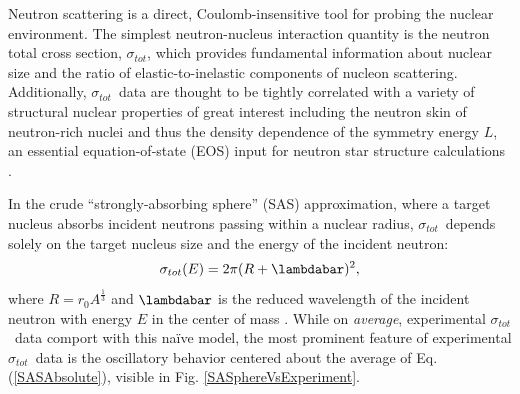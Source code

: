 \documentclass[twocolumn,secnumarabic,amssymb, nobibnotes, aps, prl,
superscriptaddress, nobalancelastpage]{revtex4}
\newcommand{\tot}{\ensuremath{\sigma_{tot}}}
\newcommand{\totRD}{\ensuremath{\sigma_{A,A'}}(E)}
\begin{document}
Neutron scattering is a direct, Coulomb-insensitive tool for probing the nuclear
environment. The simplest neutron-nucleus interaction quantity is 
the neutron total cross section, \tot, which provides fundamental information about
nuclear size and the ratio of elastic-to-inelastic components of nucleon 
scattering. Additionally, \tot\ data are thought to be tightly correlated with
a variety of structural nuclear properties of great interest
including the neutron skin of neutron-rich nuclei
\cite{Mahzoon2017} and thus the density dependence of the symmetry energy $L$,
an essential equation-of-state (EOS) input for neutron star
structure calculations \cite{Fattoyev2012, Vinas2014, Brown2000}.

In the crude ``strongly-absorbing sphere'' (SAS) approximation, where a target
nucleus absorbs incident neutrons passing within a nuclear radius,
\tot\ depends solely on the target nucleus size and the energy of the incident neutron:
\begin{equation} \label{SASAbsolute}
    \sigma_{tot}(E) = 2\pi(R + \lambdabar)^{2},
\end{equation}
where $R=r_{0}A^{\frac{1}{3}}$ and $\lambdabar$ is the reduced wavelength
of the incident neutron with energy $E$ in the center of mass \cite{Fernbach1949, Satchler1980}. 
While on \textit{average}, experimental \tot\ data comport with this na\"ive
model, the most prominent feature of experimental \tot\ data is the oscillatory
behavior centered about the average of Eq. (\ref{SASAbsolute}), visible in Fig.
\ref{SASphereVsExperiment}.
\end{document}
